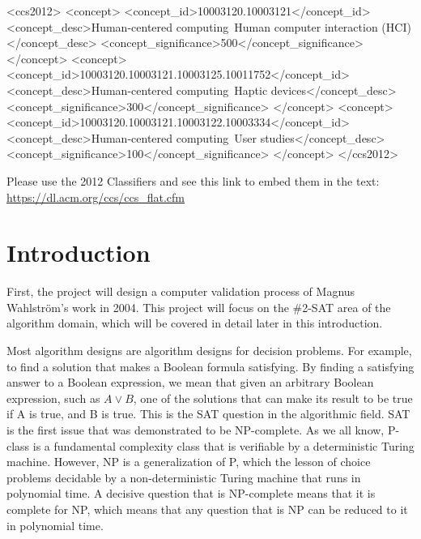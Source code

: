 \documentclass{sigchi}
\def\plainkeywords{\#SAT; \#2SAT; graph theory; complexity theory}
\begin{document}

\begin{CCSXML}
<ccs2012>
<concept>
<concept_id>10003120.10003121</concept_id>
<concept_desc>Human-centered computing~Human computer interaction (HCI)</concept_desc>
<concept_significance>500</concept_significance>
</concept>
<concept>
<concept_id>10003120.10003121.10003125.10011752</concept_id>
<concept_desc>Human-centered computing~Haptic devices</concept_desc>
<concept_significance>300</concept_significance>
</concept>
<concept>
<concept_id>10003120.10003121.10003122.10003334</concept_id>
<concept_desc>Human-centered computing~User studies</concept_desc>
<concept_significance>100</concept_significance>
</concept>
</ccs2012>
\end{CCSXML}


\keywords{\plainkeywords}

\printccsdesc
Please use the 2012 Classifiers and see this link to embed them in the text: \url{https://dl.acm.org/ccs/ccs_flat.cfm}



\section{Introduction}
First, the project will design a computer validation process of Magnus Wahlström's work in 2004.\cite{10.1016/j.tcs.2004.10.037} This project will focus on the \#2-SAT area of the algorithm domain, which will be covered in detail later in this introduction.

Most algorithm designs are algorithm designs for decision problems. For example, to find a solution that makes a Boolean formula satisfying. By finding a satisfying answer to a Boolean expression, we mean that given an arbitrary Boolean expression, such as $A \vee B $, one of the solutions that can make its result to be true if A is true, and B is true. This is the SAT question in the algorithmic field. SAT is the first issue that was demonstrated to be NP-complete.\cite{10.1145/800157.805047} As we all know, P-class is a fundamental complexity class that is verifiable by a deterministic Turing machine. However, NP is a generalization of P, which the lesson of choice problems decidable by a non-deterministic Turing machine that runs in polynomial time. A decisive question that is NP-complete means that it is complete for NP, which means that any question that is NP can be reduced to it in polynomial time.
\end{document}
